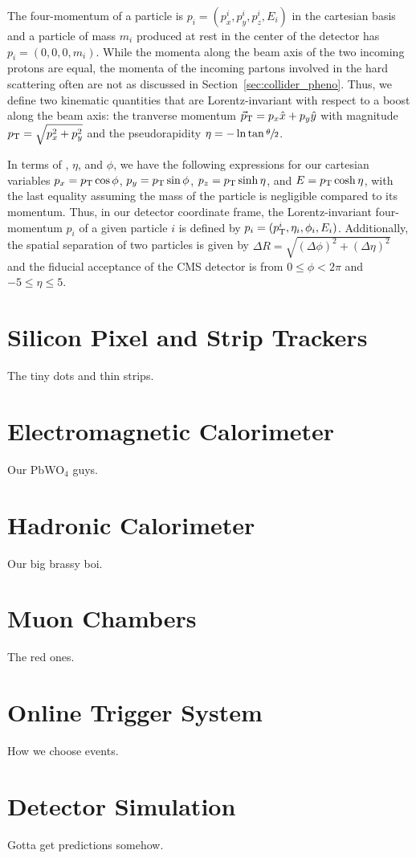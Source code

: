 The four-momentum of a particle is $p_i = (p_x^i, p_y^i, p_z^i, E_i)$ in the cartesian basis 
and a particle of mass $m_i$ produced at rest in the center of the detector has $p_i = (0, 0, 0, m_i)$.
While the momenta along the beam axis of the two incoming protons are equal, the momenta of the incoming partons involved in the hard scattering often are not as discussed in Section~\ref{sec:collider_pheno}.
Thus, we define two kinematic quantities that are Lorentz-invariant with respect to a boost along the beam axis:
the tranverse momentum ${\vec p}_{\mathrm{T}} = p_x \hat x + p_y \hat y$ with magnitude $p_{\mathrm{T}} = \sqrt{p_x^2 + p_y^2}$ and the pseudorapidity $\eta = - \ln \tan\sfrac{\theta}{2}$.

In terms of \pt, $\eta$, and $\phi$, we have the following expressions for our cartesian variables $p_x = p_{\mathrm{T}} \cos \phi$, $p_y = p_{\mathrm{T}} \sin \phi$, $p_z = p_{\mathrm{T}} \sinh \eta$, and $E = p_{\mathrm{T}} \cosh \eta$, with the last equality assuming the mass of the particle is negligible compared to its momentum.
Thus, in our detector coordinate frame, the Lorentz-invariant four-momentum $p_i$ of a given particle $i$ is defined by $p_i = (p_{\mathrm{T}}^i, \eta_i, \phi_i, E_i)$. 
Additionally, the spatial separation of two particles is given by $\Delta R = \sqrt{(\Delta\phi)^2 + (\Delta\eta)^2}$ and the fiducial acceptance of the CMS detector is from $0 \le \phi < 2\pi$ and $-5 \le \eta \le 5$.




\section{Silicon Pixel and Strip Trackers}
\label{sec:cms_tracker}

The tiny dots and thin strips.

\section{Electromagnetic Calorimeter}

Our PbWO$_{4}$ guys.

\section{Hadronic Calorimeter}

Our big brassy boi.

\section{Muon Chambers}

The red ones.

\section{Online Trigger System}

How we choose events.

\section{Detector Simulation}

Gotta get predictions somehow.



